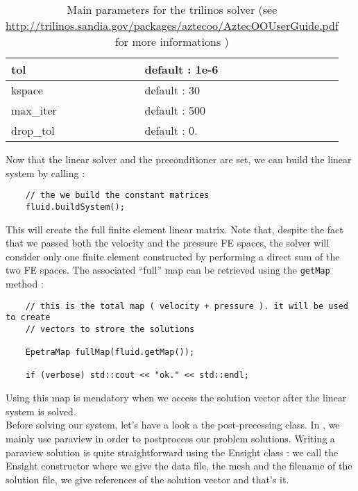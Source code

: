 {\begin{table}
\begin{center}
\begin{tabular}{|l|l|}
\hline

tol   & default : 1e-6  \\

\hline

kspace & default : 30  \\

\hline

max\_iter & default : 500  \\

\hline

drop\_tol & default : 0. \\

\hline

\end{tabular}
\end{center}
\caption{Main parameters for the trilinos solver (see \url{
http://trilinos.sandia.gov/packages/aztecoo/AztecOOUserGuide.pdf} for more informations )
}
\label{table-solveroptions}
\end{table}

Now that the linear solver and the preconditioner are set, we can build the linear system by calling :
\begin{verbatim}
    // the we build the constant matrices
    fluid.buildSystem();
\end{verbatim}

This will create the full finite element linear matrix. Note that, despite the fact
that we passed both the velocity and the pressure FE spaces, the solver will consider
only one finite element constructed by performing a direct sum of the two FE spaces.
The associated ``full'' map can be retrieved using the \verb|getMap| method :

\begin{verbatim}
    // this is the total map ( velocity + pressure ). it will be used to create
    // vectors to strore the solutions

    EpetraMap fullMap(fluid.getMap());

    if (verbose) std::cout << "ok." << std::endl;
\end{verbatim}

Using this map is mendatory when we access the solution vector after the linear system is solved.\\
Before solving our system, let's have a look a the post-precessing class.
In \lifev, we mainly use paraview in order to postprocess our problem solutions.
Writing a paraview solution is quite straightforward using the Ensight class :
we call the Ensight constructor where we give the data file, the mesh and the filename of the solution file,
we give references of the solution vector and that's it.

}
